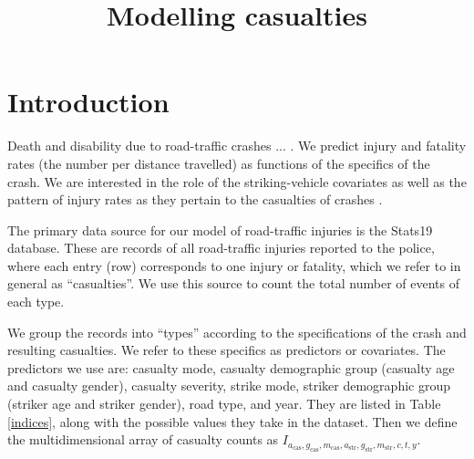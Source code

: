 \documentclass{article}
\title{Modelling casualties}
\begin{document}
\maketitle


\section{Introduction}

Death and disability due to road-traffic crashes ... . We predict injury and fatality rates (the number per distance travelled) as functions of the specifics of the crash. We are interested in the role of the striking-vehicle covariates as well as the pattern of injury rates as they pertain to the casualties of crashes \citep{Feleke2017,Scholes2017a}.

The primary data source for our model of road-traffic injuries is the Stats19 database. These are records of all road-traffic injuries reported to the police, where each entry (row) corresponds to one injury or fatality, which we refer to in general as ``casualties''. We use this source to count the total number of events of each type.

We group the records into ``types'' according to the specifications of the crash and resulting casualties. We refer to these specifics as predictors or covariates. The predictors we use are: casualty mode, casualty demographic group (casualty age and casualty gender), casualty severity, strike mode, striker demographic group (striker age and striker gender), road type, and year. %
They are listed in Table \ref{indices}, along with the possible values they take in the dataset. Then we define the multidimensional array of casualty counts as $I_{a_{\text{cas}},g_{\text{cas}},m_{\text{cas}},a_{\text{str}},g_{\text{str}},m_{\text{str}},c,t,y}$.
\end{document}
